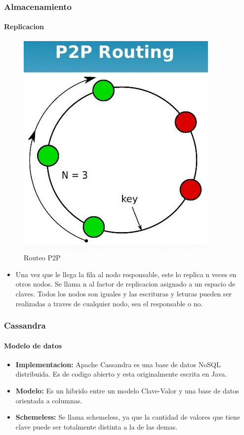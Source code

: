 \documentclass{beamer}
\begin{document}
\begin{frame}
  \frametitle{Almacenamiento}
  \framesubtitle{Replicacion}
   \begin{figure}[h!]
      \centering        
      \includegraphics[scale=0.25]{p2p.jpg}
      \caption{Routeo P2P}
  \end{figure}
  \begin{itemize}
    \setlength{\itemsep}{1pt}
    \item Una vez que le llega la fila al nodo responsable, este lo replica n veces en otros nodos. Se llama n al factor de replicacion asignado a un espacio de claves. Todos los nodos son iguales y las escrituras y leturas pueden ser realizadas a traves de cualquier nodo, sea el responsable o no.
    
    \end{itemize}
\end{frame}



\begin{frame}
  \frametitle{Cassandra}
  \framesubtitle{Modelo de datos}
  \begin{itemize}
    \setlength{\itemsep}{4pt}
    \item \textbf{Implementacion: } Apache Cassandra es una base de datos NoSQL distribuida. Es de codigo abierto y esta originalmente escrita en Java.
    \pause
    \item \textbf{Modelo:} Es un hibrido entre un modelo Clave-Valor y una base de datos orientada a columnas. 
    \pause
    \item \textbf{Schemeless:} Se llama schemeless, ya que la cantidad de valores que tiene clave puede ser totalmente distinta a la de las demas.
  \end{itemize}
\end{frame}
  
\end{document}
